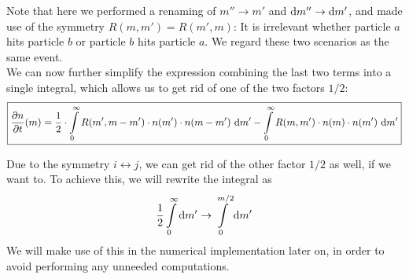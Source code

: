     Note that here we performed a renaming of $m'' \to m'$ and $\text dm'' \to \text dm'$, 
    and made use of the symmetry $R(m, m') = R(m', m)$: It is irrelevant whether particle $a$ 
    hits particle $b$ or particle $b$ hits particle $a$. We regard these two scenarios as the 
    same event. \\
 
    We can now further simplify the expression combining the last two terms into a single 
    integral, which allows us to get rid of one of the two factors $1/2$:
    \begin{align}
        \boxed{\frac{\partial n}{\partial t}(m)
            =   
                \frac{1}{2} \cdot
                \int\limits_0^\infty
                R(m',m-m')
                \cdot n(m')
                \cdot n(m-m')
                \ \text{d} m'
                -
                \int\limits_0^\infty
                R(m,m')
                \cdot n(m)
                \cdot n(m')
                \ \text{d} m'
            }
    \end{align}

    Due to the symmetry $i \leftrightarrow j$, we can get rid of the other factor $1/2$ as well,
    if we want to. To achieve this, we will rewrite the integral as
    \begin{equation}
        \frac{1}{2} \int\limits_0^\infty \text dm'
        \to 
        \int\limits_0^{m/2} \text dm'
    \end{equation}
    We will make use of this in the numerical implementation later on, in order to avoid
    performing any unneeded computations. 


